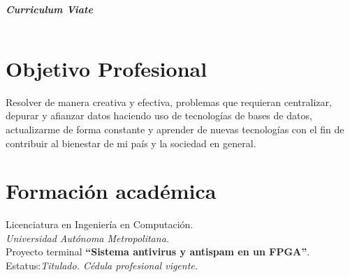 \documentclass[21pt, onecolumn]{article} %
\date{}
\begin{document}
\begin{center}
 \LARGE	 \textbf{\textit{Curriculum Viate}}\\
\end{center}



\begin{tabular}{ l l }

%

 \end{tabular}

\section*{ Objetivo Profesional }

Resolver de manera creativa y efectiva, problemas que requieran centralizar, depurar y afianzar datos haciendo uso de tecnologías de bases de  datos, actualizarme de forma constante y aprender de nuevas tecnologías con el fin de contribuir al bienestar de mi país y la sociedad en general.

\section*{ Formación académica }

\begin{flushleft}
\begin{itemize}
\begin{flushleft}

 \item Licenciatura en Ingeniería en Computación.\\
  \emph{Universidad Autónoma Metropolitana.}\\
Proyecto terminal \textbf{``Sistema antivirus y antispam en un
FPGA''}.\\
Estatus:\textit{Titulado. Cédula profesional vigente.}
\end{flushleft}
\end{itemize}
\end{flushleft}
\end{document}
